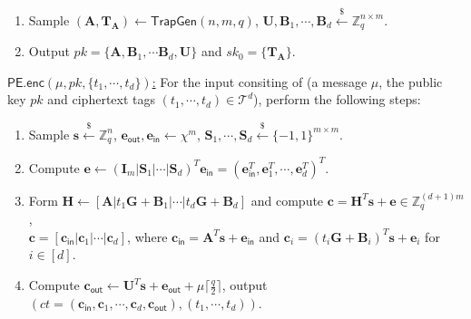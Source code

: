 \documentclass[runningheads,10pt]{llncs}
\begin{document}
\begin{description}
\begin{enumerate}
		\item Sample $(\textbf{A},\textbf{T}_\textbf{A}) \leftarrow \textsf{TrapGen}(n,m,q)$,  $\textbf{U},\textbf{B}_1, \cdots ,\textbf{B}_d \xleftarrow{\$} \mathbb{Z}_q^{n \times m}$.
		\item Output $pk=\{\textbf{A},\textbf{B}_1, \cdots \textbf{B}_d , \textbf{U}\}$ and $sk_0=\{\textbf{T}_\textbf{A}\}$.
	\end{enumerate}
	\item \underline{$\textsf{PE.enc}(\mu,  pk, \{t_1, \cdots, t_d\})$:} 
	For the input consiting of (a message $\mu$,  the public key $pk$ and ciphertext tags $(t_1, \cdots, t_d) \in \mathcal{T}^d$), 
	perform the following steps:
	\begin{enumerate}
		\item Sample $\textbf{s} \xleftarrow{\$}\mathbb{Z}_q^{n}$, 
		$\textbf{e}_\textsf{out}, \textbf{e}_\textsf{in} \leftarrow \chi^{m}$,  $\textbf{S}_1, \cdots, \textbf{S}_{d} \xleftarrow{\$} \{-1,1\}^{m \times m}$.
		\item Compute $\textbf{e}\leftarrow (\textbf{I}_m|\textbf{S}_1|\cdots|\textbf{S}_{d})^T\textbf{e}_\textsf{in}=(\textbf{e}_{ \textsf{in}}^T, \textbf{e}_{1}^T, \cdots, \textbf{e}_{d}^T)^T $.
		\item Form $\textbf{H}\leftarrow [\textbf{A}|t_1\textbf{G}+\textbf{B}_1|\cdots |t_d \textbf{G}+\textbf{B}_d]$ 
		and compute $\textbf{c}=\textbf{H}^T\textbf{s}+\textbf{e} \in \mathbb{Z}_q^{(d+1)m}$,\\
		$\textbf{c}=[\textbf{c}_\textsf{in}|\textbf{c}_1|\cdots |\textbf{c}_d]$, where $\textbf{c}_{\textsf{in}}=\textbf{A}^T \textbf{s}+\textbf{e}_{\textsf{in}}$
		and  $\textbf{c}_{i}=(t_i\textbf{G}+\textbf{B}_i)^T \textbf{s}+\textbf{e}_{i}$ for $i\in [d]$.
		\item Compute $\textbf{c}_{\textsf{out}} \leftarrow \textbf{U}^T \textbf{s}+\textbf{e}_{\textsf{out}}+\mu \lceil \frac{q}{2} \rceil$, output $(ct= (\textbf{c}_{\textsf{in}}, \textbf{c}_1, \cdots, \textbf{c}_d, \textbf{c}_{\textsf{out}}), (t_1, \cdots, t_d)) $.
	\end{enumerate}
	\iffalse
	\item \underline{$\textsf{PE. pun}(\textbf{A}, kp_{0},t^*_1)$:}  // for the case $i=1$
	\begin{enumerate}
		\item Parse $kp_{0}:=\textbf{T}_{\textbf{A}}$
		\item $\textbf{B}_{eq_{1}}^{(1)} \leftarrow \textsf{Eval}_\textsf{pk}(eq_{t^*_1}, \textbf{B}_1)$, $\cdots$, $\textbf{B}_{eq_{1}}^{(d)} \leftarrow \textsf{Eval}_\textsf{pk}(eq_{t^*_1}, \textbf{B}_d)$
		\item Let $\textbf{B}_{eq_{1}}:=\textbf{B}_{eq_{1}}^{(1)}+\cdots+\textbf{B}_{eq_{_1}}^{(d)}$
		\item $\textbf{T}_{eq_{1}} \leftarrow \textsf{ExtBasis}([\textbf{A} |\textbf{B}_{eq_{1}}], \textbf{T}_{\textbf{A}}, \sigma')$
		\item Output $kp_1:=\{\textbf{T}_{eq_{1}},t^*_1, \textbf{B}_{eq_{1}}\}$
	\end{enumerate}
	\fi   
	

\end{description}
\end{document}
